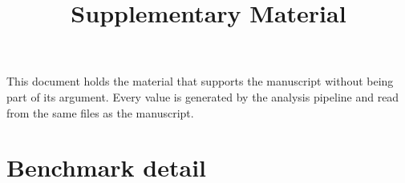 \documentclass[a4paper,11pt]{article}
\title{Supplementary Material\\[0.4em]
\large \projtitle}
\date{}
\newcommand{\projtable}[1]{}
\begin{document}
\maketitle

This document holds the material that supports the manuscript without being part of its argument. Every value is
generated by the analysis pipeline and read from the same files as the manuscript.

\section*{Benchmark detail}

\begin{table}[htbp]
	\centering
	\caption{An example of a generated table. The caption is written by hand here, next to the item it describes,
		while the body comes from latex/ and is overwritten on every run; a caption that states a number states it
		with a macro, as this one does: \DemoNSamples{} samples.}
	\label{tab:demo}
	\projtable{latex/demo_table.tex}
\end{table}



\end{document}
